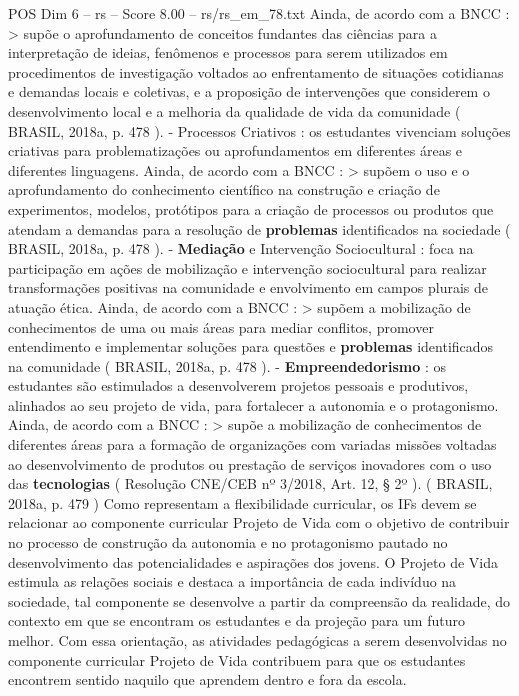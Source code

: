 \begin{textsample}{POS Dim 6 – rs – Score 8.00 – rs/rs\_em\_78.txt}
Ainda, de acordo com a BNCC : > supõe o aprofundamento de conceitos fundantes das ciências para a interpretação de ideias, fenômenos e processos para serem utilizados em procedimentos de investigação voltados ao enfrentamento de situações cotidianas e demandas locais e coletivas, e a proposição de intervenções que considerem o desenvolvimento local e a melhoria da qualidade de vida da comunidade ( BRASIL, 2018a, p. 478 ). - Processos Criativos : os estudantes vivenciam soluções criativas para problematizações ou aprofundamentos em diferentes áreas e diferentes linguagens.
Ainda, de acordo com a BNCC : > supõem o uso e o aprofundamento do conhecimento científico na construção e criação de experimentos, modelos, protótipos para a criação de processos ou produtos que atendam a demandas para a resolução de \textbf{problemas} identificados na sociedade ( BRASIL, 2018a, p. 478 ). - \textbf{Mediação} e Intervenção Sociocultural : foca na participação em ações de mobilização e intervenção sociocultural para realizar transformações positivas na comunidade e envolvimento em campos plurais de atuação ética.
Ainda, de acordo com a BNCC : > supõem a mobilização de conhecimentos de uma ou mais áreas para mediar conflitos, promover entendimento e implementar soluções para questões e \textbf{problemas} identificados na comunidade ( BRASIL, 2018a, p. 478 ). - \textbf{Empreendedorismo} : os estudantes são estimulados a desenvolverem projetos pessoais e produtivos, alinhados ao seu projeto de vida, para fortalecer a autonomia e o protagonismo.
Ainda, de acordo com a BNCC : > supõe a mobilização de conhecimentos de diferentes áreas para a formação de organizações com variadas missões voltadas ao desenvolvimento de produtos ou prestação de serviços inovadores com o uso das \textbf{tecnologias} ( Resolução CNE/CEB nº 3/2018, Art. 12, § 2º ). ( BRASIL, 2018a, p. 479 ) Como representam a flexibilidade curricular, os IFs devem se relacionar ao componente curricular Projeto de Vida com o objetivo de contribuir no processo de construção da autonomia e no protagonismo pautado no desenvolvimento das potencialidades e aspirações dos jovens.
O Projeto de Vida estimula as relações sociais e destaca a importância de cada indivíduo na sociedade, tal componente se desenvolve a partir da compreensão da realidade, do contexto em que se encontram os estudantes e da projeção para um futuro melhor.
Com essa orientação, as atividades pedagógicas a serem desenvolvidas no componente curricular Projeto de Vida contribuem para que os estudantes encontrem sentido naquilo que aprendem dentro e fora da escola.

\end{textsample}
